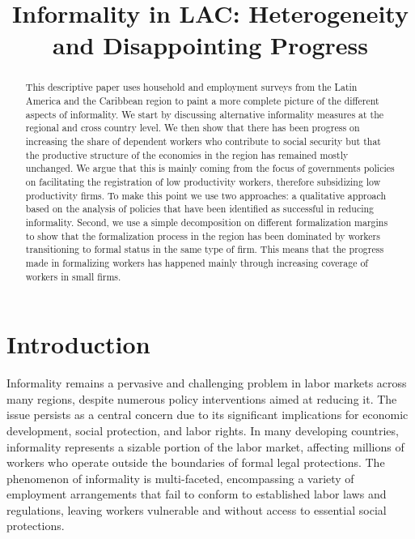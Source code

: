 \documentclass[english]{article}
\begin{document}
\title{Informality in LAC: Heterogeneity and Disappointing Progress}
\maketitle
\begin{abstract}

    This descriptive paper uses household and employment surveys from the Latin America and the Caribbean region to paint a more complete picture of the different aspects of informality. We start by discussing alternative informality measures at the regional and cross country level. We then show that there has been progress on increasing the share of dependent workers who contribute to social security but that the productive structure of the economies in the region has remained mostly unchanged. We argue that this is mainly coming from the focus of governments policies on facilitating the registration of low productivity workers, therefore subsidizing low productivity firms. To make this point we use two approaches: a qualitative approach based on the analysis of policies that have been identified as successful in reducing informality. Second, we use a simple decomposition on different formalization margins to show that the formalization process in the region has been dominated by workers transitioning to formal status in the same type of firm. This means that the progress made in formalizing workers has happened mainly through increasing coverage of workers in small firms. 
\end{abstract}

\section{Introduction}

Informality remains a pervasive and challenging problem in labor markets across many regions, despite numerous policy interventions aimed at reducing it. The issue persists as a central concern due to its significant implications for economic development, social protection, and labor rights. In many developing countries, informality represents a sizable portion of the labor market, affecting millions of workers who operate outside the boundaries of formal legal protections. The phenomenon of informality is multi-faceted, encompassing a variety of employment arrangements that fail to conform to established labor laws and regulations, leaving workers vulnerable and without access to essential social protections.
\end{document}
